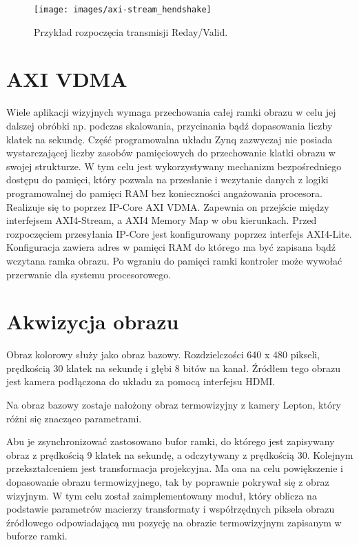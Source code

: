 \begin{figure}[h]
    \centering
    \texttt{[image: images/axi-stream\_hendshake]}
    \caption{Przykład rozpoczęcia transmisji Reday/Valid.}
    \label{fig:handshake}
\end{figure}

\section{AXI VDMA}

Wiele aplikacji wizyjnych wymaga przechowania całej ramki obrazu w celu jej dalszej obróbki np. podczas skalowania, przycinania bądź dopasowania liczby klatek na sekundę. 
Część programowalna układu Zynq zazwyczaj nie posiada wystarczającej liczby zasobów pamięciowych do przechowanie klatki obrazu w swojej strukturze. 
W tym celu jest wykorzystywany mechanizm bezpośredniego dostępu do pamięci, który pozwala na przesłanie i wczytanie danych z logiki programowalnej do pamięci RAM bez konieczności angażowania procesora. %
Realizuje się to poprzez IP-Core AXI VDMA. 
Zapewnia on przejście między interfejsem AXI4-Stream, a AXI4 Memory Map w obu kierunkach. 
Przed rozpoczęciem przesyłania IP-Core jest konfigurowany poprzez interfejs AXI4-Lite. 
Konfiguracja zawiera adres w pamięci RAM do którego ma być zapisana bądź wczytana ramka obrazu. 
Po wgraniu do pamięci ramki kontroler może wywołać przerwanie dla systemu procesorowego.

\section{Akwizycja obrazu}

Obraz kolorowy służy jako obraz bazowy. %
Rozdzielczości 640 x 480 pikseli, prędkością 30 klatek na sekundę i głębi 8 bitów na kanał. 
Źródłem tego obrazu jest kamera podłączona do układu za pomocą interfejsu HDMI. 

Na obraz bazowy zostaje nałożony obraz termowizyjny z kamery Lepton, który różni się znacząco parametrami. %

Abu je zsynchronizować zastosowano bufor ramki, do którego jest zapisywany obraz z prędkością 9 klatek na sekundę, a odczytywany z prędkością 30. 
Kolejnym przekształceniem jest transformacja projekcyjna. 
Ma ona na celu powiększenie i dopasowanie obrazu termowizyjnego, tak by poprawnie pokrywał się z obraz wizyjnym. 
W tym celu został zaimplementowany moduł, który oblicza na podstawie parametrów macierzy transformaty i współrzędnych piksela obrazu źródłowego odpowiadającą mu pozycję na obrazie termowizyjnym zapisanym w buforze ramki. %
 
